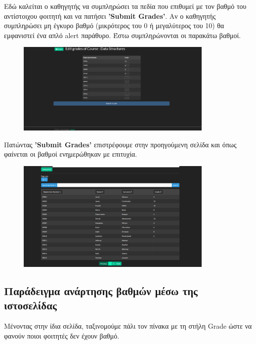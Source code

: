 \documentclass[12pt]{article}
\begin{document}
	Εδώ καλείται ο καθηγητής να συμπληρώσει τα πεδία που επιθυμεί με τον βαθμό του αντίστοιχου φοιτητή και να πατήσει \textbf{'Submit Grades'}. Αν ο καθηγητής συμπληρώσει μη έγκυρο βαθμό (μικρότερος του 0 ή μεγαλύτερος του 10) θα εμφανιστεί ένα απλό alert παράθυρο. Έστω συμπληρώνονται οι παρακάτω βαθμοί.
	
	\begin{figure}[H]
		\centering
		\includegraphics[width=0.85\textwidth]{edits234.png}
		\caption{}
		\label{fig:emptyView}
	\end{figure}

	Πατώντας \textbf{'Submit Grades'} επιστρέφουμε στην προηγούμενη σελίδα και όπως φαίνεται οι βαθμοί ενημερώθηκαν με επιτυχία.
	
	\begin{figure}[H]
		\centering
		\includegraphics[width=0.85\textwidth]{newstudents.png}
		\caption{}
		\label{fig:emptyView}
	\end{figure}

	\subsection{Παράδειγμα ανάρτησης βαθμών μέσω της ιστοσελίδας}
	
	Μένοντας στην ίδια σελίδα, ταξινομούμε πάλι τον πίνακα με τη στήλη Grade ώστε να φανούν ποιοι φοιτητές δεν έχουν βαθμό.
	
\end{document}
